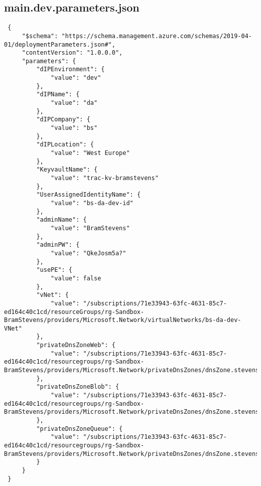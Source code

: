\documentclass[dutch,dit,thesis]{hogentreport}
\begin{document}
\subsection{main.dev.parameters.json}
\label{sec:main.dev.parameters.json}
\begin{lstlisting}
 {
     "$schema": "https://schema.management.azure.com/schemas/2019-04-01/deploymentParameters.json#",
     "contentVersion": "1.0.0.0",
     "parameters": {
         "dIPEnvironment": {
             "value": "dev"
         },
         "dIPName": {
             "value": "da"
         },
         "dIPCompany": {
             "value": "bs"
         },
         "dIPLocation": {
             "value": "West Europe"
         },
         "KeyvaultName": {
             "value": "trac-kv-bramstevens"
         },
         "UserAssignedIdentityName": {
             "value": "bs-da-dev-id"
         },
         "adminName": {
             "value": "BramStevens"
         },
         "adminPW": {
             "value": "QkeJosm5a?"
         },
         "usePE": {
             "value": false
         },
         "vNet": {
             "value": "/subscriptions/71e33943-63fc-4631-85c7-ed164c40c1cd/resourceGroups/rg-Sandbox-BramStevens/providers/Microsoft.Network/virtualNetworks/bs-da-dev-VNet"
         },
         "privateDnsZoneWeb": {
             "value": "/subscriptions/71e33943-63fc-4631-85c7-ed164c40c1cd/resourcegroups/rg-Sandbox-BramStevens/providers/Microsoft.Network/privateDnsZones/dnsZone.stevensbram"
         },
         "privateDnsZoneBlob": {
             "value": "/subscriptions/71e33943-63fc-4631-85c7-ed164c40c1cd/resourcegroups/rg-Sandbox-BramStevens/providers/Microsoft.Network/privateDnsZones/dnsZone.stevensbram"
         },
         "privateDnsZoneQueue": {
             "value": "/subscriptions/71e33943-63fc-4631-85c7-ed164c40c1cd/resourcegroups/rg-Sandbox-BramStevens/providers/Microsoft.Network/privateDnsZones/dnsZone.stevensbram"
         }
     }
 }
\end{lstlisting}
\end{document}
